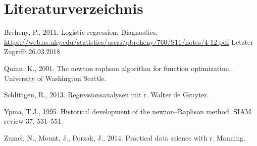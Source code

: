 \documentclass[12pt,]{article}
\begin{document}
\section*{Literaturverzeichnis}\label{literaturverzeichnis}

\hypertarget{refs}{}
\hypertarget{ref-breheny11}{}
Breheny, P., 2011. Logistic regression: Diagnostics.
\url{https://web.as.uky.edu/statistics/users/pbreheny/760/S11/notes/4-12.pdf}
Letzter Zugriff: 26.03.2018

\hypertarget{ref-quinn2001newton}{}
Quinn, K., 2001. The newton raphson algorithm for function optimization.
University of Washington Seattle.

\hypertarget{ref-schlittgen2013regressionsanalysen}{}
Schlittgen, R., 2013. Regressionsanalysen mit r. Walter de Gruyter.

\hypertarget{ref-ypma1995historical}{}
Ypma, T.J., 1995. Historical development of the newton--Raphson method.
SIAM review 37, 531--551.

\hypertarget{ref-zumel2014practical}{}
Zumel, N., Mount, J., Porzak, J., 2014. Practical data science with r.
Manning.
\end{document}
